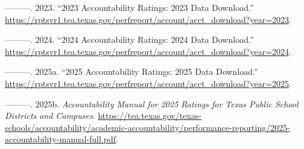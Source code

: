 \documentclass[
  letterpaper,
  DIV=11,
  numbers=noendperiod]{scrreprt}
\newlength{\cslhangindent}
\newenvironment{CSLReferences}[2] %
 {\begin{list}{}{%
  \setlength{\itemindent}{0pt}
  \setlength{\leftmargin}{0pt}
  \setlength{\parsep}{0pt}
  \ifodd #1
   \setlength{\leftmargin}{\cslhangindent}
   \setlength{\itemindent}{-1\cslhangindent}
  \fi
  \setlength{\itemsep}{#2\baselineskip}}}
 {\end{list}}
\begin{document}
\begin{CSLReferences}{1}{0}
---------. 2023. {``2023 Accountability Ratings: 2023 Data Download.''}
\url{https://rptsvr1.tea.texas.gov/perfreport/account/acct_download?year=2023}.

---------. 2024. {``2024 Accountability Ratings: 2024 Data Download.''}
\url{https://rptsvr1.tea.texas.gov/perfreport/account/acct_download?year=2024}.

---------. 2025a. {``2025 Accountability Ratings: 2025 Data Download.''}
\url{https://rptsvr1.tea.texas.gov/perfreport/account/acct_download?year=2025}.

---------. 2025b. \emph{Accountability Manual for 2025 Ratings for Texas
Public School Districts and Campuses}.
\url{https://tea.texas.gov/texas-schools/accountability/academic-accountability/performance-reporting/2025-accountability-manual-full.pdf}.

\end{CSLReferences}
\end{document}
